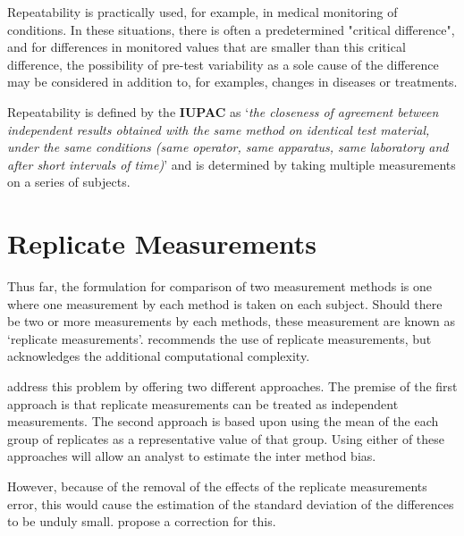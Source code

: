 \documentclass[12pt, a4paper]{report}
\theoremstyle{plain}
\theoremstyle{definition}
\theoremstyle{remark}
\begin{document}
	Repeatability is practically used, for example, in medical monitoring of conditions. In these situations, there is often a predetermined "critical difference", and for differences in monitored values that are smaller than this critical difference, the possibility of pre-test variability as a sole cause of the difference may be considered in addition to, for examples, changes in diseases or treatments.
	
	Repeatability is defined by the \textbf{IUPAC} as `\textit{the closeness of agreement between independent results obtained with the same method on identical test material, under the same conditions (same
		operator, same apparatus, same laboratory and after short intervals of time)}'  and is determined by taking multiple measurements on a series of subjects.
	
	
	
	
	
	\newpage
	\section{Replicate Measurements}
	
	Thus far, the formulation for comparison of two measurement
	methods is one where one measurement by each method is taken on
	each subject. Should there be two or more measurements by each
	methods, these measurement are known as `replicate measurements'.
	\citet{BXC2008} recommends the use of replicate measurements, but
	acknowledges the additional computational complexity.
	
	\citet*{BA86} address this problem by offering two different
	approaches. The premise of the first approach is that replicate
	measurements can be treated as independent measurements. The
	second approach is based upon using the mean of the each group of
	replicates as a representative value of that group. Using either
	of these approaches will allow an analyst to estimate the inter
	method bias.
	
	
	However, because of the removal of the effects of the replicate
	measurements error, this would cause the estimation of the
	standard deviation of the differences to be unduly small.
	\citet*{BA86} propose a correction for this.
	
\end{document}
